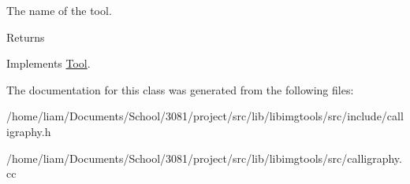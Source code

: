 The name of the tool. 

\begin{DoxyReturn}{Returns}

\end{DoxyReturn}


Implements \hyperlink{classTool_a89abd746706ed78911924a47928d6d06}{Tool}.



The documentation for this class was generated from the following files\+:\begin{DoxyCompactItemize}
\item 
/home/liam/\+Documents/\+School/3081/project/src/lib/libimgtools/src/include/calligraphy.\+h\item 
/home/liam/\+Documents/\+School/3081/project/src/lib/libimgtools/src/calligraphy.\+cc\end{DoxyCompactItemize}
